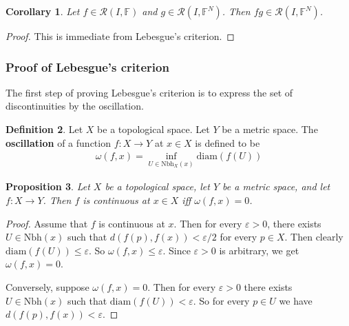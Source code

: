 \documentclass[12pt,b5paper,notitlepage]{article}
\theoremstyle{definition}
\newtheorem{df}{Definition}[section]
\theoremstyle{plain}
\newtheorem{pp}[df]{Proposition}
\newtheorem{co}[df]{Corollary}
\newcommand{\scr}{\mathscr}
\newcommand{\Fbb}{\mathbb F}
\newcommand{\Nbh}{\mathrm{Nbh}}
\newcommand{\diam}{\mathrm{diam}}
\newcommand{\eps}{\varepsilon}
\numberwithin{equation}{section}
\begin{document}
\begin{co}
Let $f\in\scr R(I,\Fbb)$ and $g\in\scr R(I,\Fbb^N)$. Then $fg\in\scr R(I,\Fbb^N)$.
\end{co}

\begin{proof}
This is immediate from Lebesgue's criterion.
\end{proof}


\subsubsection{Proof of Lebesgue's criterion}


The first step of proving Lebesgue's criterion is to express the set of discontinuities by the oscillation.

\begin{df}\label{lb462}
Let $X$ be a topological space. Let $Y$ be a metric space. The \textbf{oscillation}   of a function $f:X\rightarrow Y$ at $x\in X$ is defined to be
\begin{align*}
\omega(f,x)=\inf_{U\in\Nbh_X(x)}\diam(f(U))
\end{align*}
\end{df}


\begin{pp}\label{lb461}
Let $X$ be a topological space, let $Y$ be a metric space, and let $f:X\rightarrow Y$. Then  $f$ is continuous at $x\in X$ iff $\omega(f,x)=0$.
\end{pp}


\begin{proof}
Assume that $f$ is continuous at $x$. Then for every $\eps>0$, there exists $U\in\Nbh(x)$ such that $d(f(p),f(x))<\eps/2$ for every $p\in X$. Then clearly $\diam(f(U))\leq\eps$. So $\omega(f,x)\leq \eps$. Since $\eps>0$ is arbitrary, we get $\omega(f,x)=0$.

Conversely, suppose $\omega(f,x)=0$. Then for every $\eps>0$ there exists $U\in\Nbh(x)$ such that $\diam(f(U))<\eps$. So for every $p\in U$ we have $d(f(p),f(x))<\eps$.
\end{proof}
\end{document}
